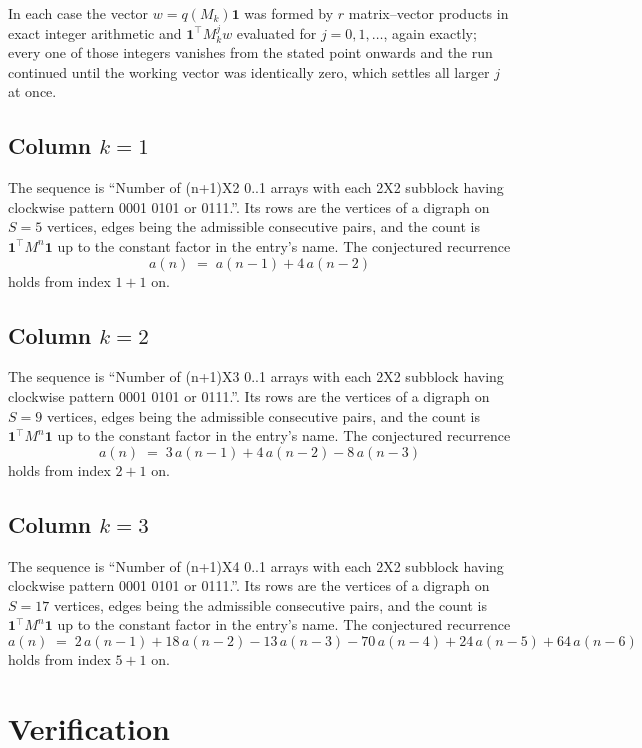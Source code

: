 \documentclass[11pt,a4paper]{article}
\theoremstyle{plain}
\theoremstyle{definition}
\begin{document}
In each case the vector $w=q(M_k)\mathbf{1}$ was formed by $r$ matrix--vector products in
exact integer arithmetic and $\mathbf{1}^{\!\top}M_k^{j}w$ evaluated for $j=0,1,\dots$,
again exactly; every one of those integers vanishes from the stated point onwards and the run
continued until the working vector was identically zero, which settles all larger $j$ at once.

\subsection*{Column $k$$=1$}
The sequence is ``Number of (n+1)X2 0..1 arrays with each 2X2 subblock having clockwise pattern 0001 0101 or 0111.''. Its rows are the vertices of a digraph on
$S=5$ vertices, edges being the admissible consecutive pairs, and the count is
$\mathbf{1}^{\!\top}M^{n}\mathbf{1}$ up to the constant factor in the entry's name.
The conjectured recurrence
\[
a(n)\;=\;a(n-1) + 4\,a(n-2)
\]
holds from index $1+1$ on.

\subsection*{Column $k$$=2$}
The sequence is ``Number of (n+1)X3 0..1 arrays with each 2X2 subblock having clockwise pattern 0001 0101 or 0111.''. Its rows are the vertices of a digraph on
$S=9$ vertices, edges being the admissible consecutive pairs, and the count is
$\mathbf{1}^{\!\top}M^{n}\mathbf{1}$ up to the constant factor in the entry's name.
The conjectured recurrence
\[
a(n)\;=\;3\,a(n-1) + 4\,a(n-2) - 8\,a(n-3)
\]
holds from index $2+1$ on.

\subsection*{Column $k$$=3$}
The sequence is ``Number of (n+1)X4 0..1 arrays with each 2X2 subblock having clockwise pattern 0001 0101 or 0111.''. Its rows are the vertices of a digraph on
$S=17$ vertices, edges being the admissible consecutive pairs, and the count is
$\mathbf{1}^{\!\top}M^{n}\mathbf{1}$ up to the constant factor in the entry's name.
The conjectured recurrence
\[
a(n)\;=\;2\,a(n-1) + 18\,a(n-2) - 13\,a(n-3) - 70\,a(n-4) + 24\,a(n-5) + 64\,a(n-6)
\]
holds from index $5+1$ on.

\section{Verification}
\end{document}
